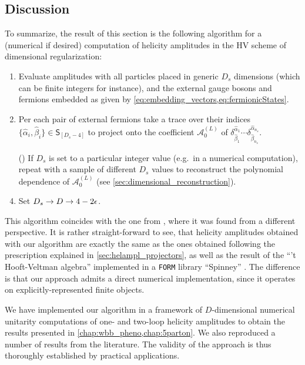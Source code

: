 \subsection{Discussion}
\label{sec:dshel_discussion}

To summarize, the result of this section is the following algorithm for
a (numerical if desired) computation of helicity amplitudes in the HV scheme of dimensional regularization:
\begin{enumerate}[label={\arabic*.}]
  \item Evaluate amplitudes with all particles placed in generic $D_s$ dimensions (which can be finite integers for instance), 
    and the external gauge bosons and fermions embedded as given by \cref{eq:embedding_vectors,eq:fermionicStates}.
  \item Per each pair of external fermions take a trace over their indices $\{\hat{\alpha}_i,\hat{\beta}_i\} \in \mathsf{S}_{[D_s-4]}$ 
    to project onto the coefficient $\mathcal{A}_0^{(L)}$ of $\delta^{\hat{\alpha}_1}_{\hat{\beta}_1}\cdots \delta^{\hat{\alpha}_{n_s}}_{\hat{\beta}_{n_s}}$.
  \item[(\arabic{enumi})]  If $D_s$ is set to a particular integer value (e.g.\ in a numerical computation),
    repeat with a sample of different $D_s$ values to reconstruct the polynomial dependence of $\mathcal{A}_0^{(L)}$ (see \cref{sec:dimensional_reconstruction}).
  \item Set $D_s\to D\to 4-2\epsilon$.
\end{enumerate}
This algorithm coincides with the one from \cite{Anger:2018ove}, where it was found from a different perspective.
It is rather straight-forward to see, that
helicity amplitudes obtained 
with our algorithm are exactly the same as the ones 
obtained following the prescription explained in \cref{sec:helampl_projectors}, 
as well as the result of the ``'t Hooft-Veltman algebra'' implemented in a \texttt{FORM} library ``Spinney'' \cite{Cullen2010}.
The difference is that our approach admits a direct numerical implementation, since it
operates on explicitly-represented finite objects.

We have implemented our algorithm in a framework of $D$-dimensional numerical unitarity computations 
of one- and two-loop helicity amplitudes to obtain the results presented in \cref{chap:wbb_pheno,chap:5parton}.
We also reproduced a number of results from the literature. 
The validity of the approach is thus thoroughly established by practical applications.

